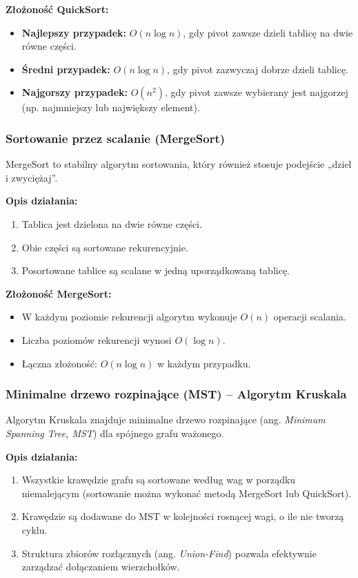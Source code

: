 \textbf{Złożoność QuickSort:}
\begin{itemize}
    \item \textbf{Najlepszy przypadek:} \( O(n \log n) \), gdy pivot zawsze dzieli tablicę na dwie równe części.
    \item \textbf{Średni przypadek:} \( O(n \log n) \), gdy pivot zazwyczaj dobrze dzieli tablicę.
    \item \textbf{Najgorszy przypadek:} \( O(n^2) \), gdy pivot zawsze wybierany jest najgorzej (np. najmniejszy lub największy element).
\end{itemize}

\subsubsection{Sortowanie przez scalanie (MergeSort)}
MergeSort to stabilny algorytm sortowania, który również stosuje podejście „dziel i zwyciężaj”.

\textbf{Opis działania:}
\begin{enumerate}
    \item Tablica jest dzielona na dwie równe części.
    \item Obie części są sortowane rekurencyjnie.
    \item Posortowane tablice są scalane w jedną uporządkowaną tablicę.
\end{enumerate}

\textbf{Złożoność MergeSort:}
\begin{itemize}
    \item W każdym poziomie rekurencji algorytm wykonuje \( O(n) \) operacji scalania.
    \item Liczba poziomów rekurencji wynosi \( O(\log n) \).
    \item Łączna złożoność: \( O(n \log n) \) w każdym przypadku.
\end{itemize}

\subsubsection{Minimalne drzewo rozpinające (MST) – Algorytm Kruskala}
Algorytm Kruskala znajduje minimalne drzewo rozpinające (ang. \textit{Minimum Spanning Tree, MST}) dla spójnego grafu ważonego.

\textbf{Opis działania:}
\begin{enumerate}
    \item Wszystkie krawędzie grafu są sortowane według wag w porządku niemalejącym (sortowanie można wykonać metodą MergeSort lub QuickSort).
    \item Krawędzie są dodawane do MST w kolejności rosnącej wagi, o ile nie tworzą cyklu.
    \item Struktura zbiorów rozłącznych (ang. \textit{Union-Find}) pozwala efektywnie zarządzać dołączaniem wierzchołków.
\end{enumerate}

